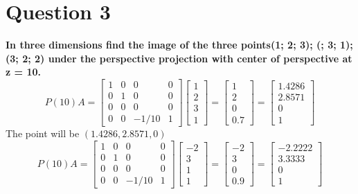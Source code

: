 \documentclass{article}
\begin{document}
\section{Question 3}
\textbf{ In three dimensions find the image of the three points(1; 2; 3); (; 3; 1); (3; 2; 2) under the perspective projection with center of perspective at z = 10.}   
$$
P(10) A=\left[\begin{array}{cccc}
1 & 0 & 0 & 0 \\
0 & 1 & 0 & 0 \\
0 & 0 & 0 & 0 \\
0 & 0 & -1 / 10 & 1
\end{array}\right]\left[\begin{array}{l}
1 \\ 2 \\ 3 \\1
\end{array}\right]=\left[\begin{array}{c}
1 \\ 2 \\0 \\ 0.7
\end{array}\right]=\left[\begin{array}{c}
1.4286 \\2.8571 \\0 \\1
\end{array}\right]
$$
The point will be $(1.4286,2.8571,0)$
$$
P(10) A=\left[\begin{array}{cccc}
1 & 0 & 0 & 0 \\
0 & 1 & 0 & 0 \\
0 & 0 & 0 & 0 \\
0 & 0 & -1 / 10 & 1
\end{array}\right]\left[\begin{array}{c}
-2 \\3 \\1 \\1
\end{array}\right]=\left[\begin{array}{c}
-2 \\3 \\0 \\0.9
\end{array}\right]=\left[\begin{array}{c}
-2.2222 \\3.3333 \\0 \\1
\end{array}\right]
$$
\end{document}
